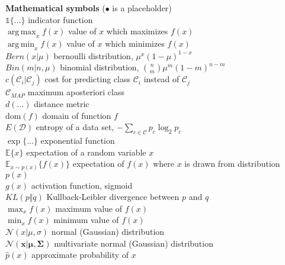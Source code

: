\documentclass[12pt]{article}
\DeclareMathOperator*{\argmax}{arg\,max}
\DeclareMathOperator*{\argmin}{arg\,min}
\begin{document}
\begin{tabbing}
	\textbf{Mathematical symbols} ($\bullet$ is a placeholder)															\\[3mm]
	\> $\mathbb{1}\{ \dots \}$							\>	indicator function										\\[3mm]
	\> $\argmax_x f(x)$								\>	value of $x$ which maximizes $f(x)$						\\[3mm]
	\> $\argmin_x f(x)$								\>	value of $x$ which minimizes $f(x)$						\\[3mm]
	\> $Bern(x \vert \mu)$							\>	bernoulli distribution, $\mu^x (1 - \mu)^{1 - x}$				\\[3mm]
	\> $Bin(m \vert n, \mu)$							\>	binomial distribution, $\binom{n}{m}\mu^m (1 - m)^{n - m}$		\\[3mm]
	\> $c(\mathcal{C}_i \vert \mathcal{C}_j)$				\>	cost for predicting class $\mathcal{C}_i$ instead of $\mathcal{C}_j$	\\[3mm]
	\> $\mathcal{C}_{MAP}$							\>	maximum aposteriori class								\\[3mm]
	\> $d(\dots)$									\>	distance metric										\\[3mm]
	\> $\text{dom}(f)$								\>	domain of function $f$									\\[3mm]
	\> $E(\mathcal{D})$								\>	entropy of a data set, $-\sum_{c \in \mathcal{C}} p_c \log_2 p_c$	\\[3mm]
	\> $\exp\{ \dots \}$								\>	exponential function									\\[3mm]
	\> $\mathbb{E}\{ x \}$							\>	expectation of a random variable $x$						\\[3mm]
	\> $\mathbb{E}_{x \sim p(x)}\{ f(x) \}$				\>	expectation of $f(x)$ where $x$ is drawn from distribution $p(x)$	\\[3mm]
	\> $g(x)$										\>	activation function, sigmoid								\\[3mm]
	\> $KL(p \Vert q)$								\>	Kullback-Leibler divergence between $p$ and $q$				\\[3mm]
	\> $\max_x f(x)$								\>	maximum value of $f(x)$								\\[3mm]
	\> $\min_x f(x)$									\>	minimum value of $f(x)$								\\[3mm]
	\> $\mathcal{N}(x \vert \mu, \sigma)$					\>	normal (Gaussian) distribution							\\[3mm]
	\> $\mathcal{N}(\bm{x} \vert \bm{\mu}, \bm{\Sigma})$		\>	multivariate normal (Gaussian) distribution					\\[3mm]
	\> $\widehat{p}(x)$								\>	approximate probability of $x$							\\[3mm]

\end{tabbing}
\end{document}

